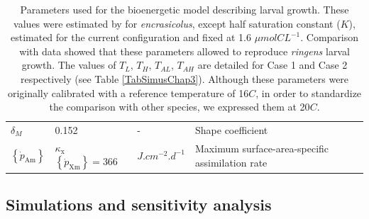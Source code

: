\begin{table}[H]
\begin{adjustbox}{width=1.0\textwidth}
\begin{tabular}{l|l|l|l}
$\delta_{M}$
	& 0.152
	& -
	& Shape coefficient                               \\
$\left \{ \dot{p}_\mathrm{Am} \right \}$
	& $\kappa_{\mathrm{x}} $ $\left \{ \dot{p}_\mathrm{Xm} \right \}=366$
	& $J.cm^{-2}.d^{-1}$
	& Maximum surface-area-specific assimilation rate\\
\hline
\end{tabular}
\end{adjustbox}
\caption{Parameters used for the bioenergetic model describing larval growth. These values were estimated by \cite{PethRoos2013} for \textit{\gls{encrasicolus}}, except half saturation constant ($K$), estimated for the current configuration and fixed at 1.6 $\mu mol CL^{-1}$. Comparison with data showed that these parameters allowed to reproduce \textit{\gls{ringens}} larval growth. The values of $T_{L}$, $T_{H}$, $T_{AL}$, $T_{AH}$ are detailed for Case 1 and Case 2 respectively (see Table \ref{TabSimusChap3}). Although these parameters were originally calibrated with a reference temperature of 16\textdegree $C$, in order to standardize the comparison with other species, we expressed them at 20\textdegree $C$.}
\label{TabDEBparEncra}
\end{table}

\subsection{Simulations and sensitivity analysis}

